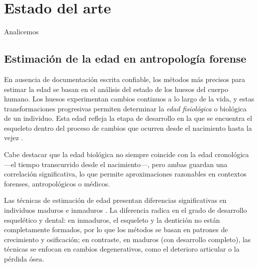 \chapter{Estado del arte}

Analicemos


\section{Estimación de la edad en antropología forense}

En ausencia de documentación escrita confiable, los métodos más precisos para estimar la edad se basan en el 
análisis del estado de los huesos del cuerpo humano. Los huesos experimentan cambios continuos a lo largo de 
la vida, y estas transformaciones progresivas permiten determinar la \textit{edad fisiológica} o biológica de 
un individuo. Esta edad refleja la etapa de desarrollo en la que se encuentra el esqueleto dentro del proceso 
de cambios que ocurren desde el nacimiento hasta la vejez \cite{byers2023}.

Cabe destacar que la edad biológica no siempre coincide con la edad cronológica ---el tiempo transcurrido 
desde el nacimiento---, pero ambas guardan una correlación significativa, lo que permite aproximaciones 
razonables en contextos forenses, antropológicos o médicos.

Las técnicas de estimación de edad presentan diferencias significativas en individuos maduros e inmaduros
\cite{ubelaker2019}. La diferencia radica en el grado de desarrollo esquelético y dental: en inmaduros, el 
esqueleto y la dentición no están completamente formados, por lo que los métodos se basan en patrones de 
crecimiento y osificación; en contraste, en maduros (con desarrollo completo), las técnicas se enfocan en 
cambios degenerativos, como el deterioro articular o la pérdida ósea.


